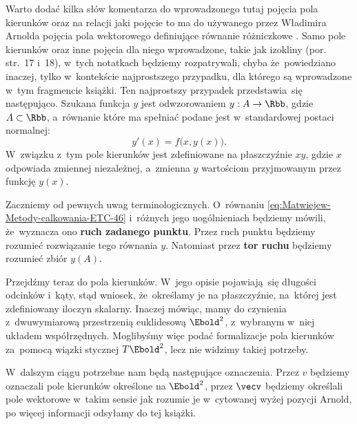 \documentclass[a4paper,11pt]{article}
\numberwithin{equation}{section}
\begin{document}
\VerSpaceFour





\noindent
{} Warto dodać kilka słów komentarza do wprowadzonego tutaj
pojęcia pola kierunków oraz na relacji jaki pojęcie to ma do używanego
przez Władimira Arnolda pojęcia pola wektorowego definiujące równanie
różniczkowe \cite{ArnoldRownaniaRozniczkoweZwyczajne1975}. Samo pole
kierunków oraz inne pojęcia dla niego wprowadzone, takie jak izokliny
(por. str.~17 i~18), w~tych notatkach będziemy rozpatrywali, chyba
że~powiedziano inaczej, tylko w~kontekście najprostszego przypadku, dla
którego są wprowadzone w~tym fragmencie książki. Ten najprostszy przypadek
przedstawia~się następująco. Szukana funkcja $y$ jest odwzorowaniem
$y : A \to \Rbb$, gdzie $A \subset \Rbb$, a~równanie które ma spełniać podane
jest w~standardowej postaci normalnej:
\begin{equation}
  \label{eq:Uwagi-do-konkrentych-stron-27}
  y'( x ) = f\big( x, y( x ) \big).
\end{equation}
W~związku z~tym pole kierunków jest zdefiniowane na płaszczyźnie $xy$,
gdzie $x$ odpowiada zmiennej niezależnej, a~zmienna $y$ wartościom
przyjmowanym przez funkcję $y( x )$.

Zaczniemy od pewnych uwag terminologicznych. O~równaniu
\eqref{eq:Matwiejew-Metody-calkowania-ETC-46} i~różnych jego
uogólnieniach będziemy mówili, że~wyznacza ono
\textbf{ruch zadanego punktu}. Przez ruch punktu będziemy rozumieć
rozwiązanie tego równania $y$. Natomiast przez \textbf{tor ruchu} będziemy
rozumieć zbiór $y( A )$.

Przejdźmy teraz do pola kierunków. W~jego opisie pojawiają~się długości
odcinków i~kąty, stąd wniosek, że~określamy je na płaszczyźnie, na~której
jest zdefiniowany iloczyn skalarny. Inaczej mówiąc, mamy do czynienia
z~dwuwymiarową
przestrzenią euklidesową $\Ebold^{ 2 }$, z~wybranym w~niej układem
współrzędnych. Moglibyśmy więc podać formalizacje pola kierunków za~pomocą
wiązki stycznej $T \Ebold^{ 2 }$, lecz nie widzimy takiej potrzeby.

W~dalszym ciągu potrzebne nam będą następujące oznaczenia. Przez $v$
będziemy oznaczali pole kierunków określone na $\Ebold^{ 2 }$, przez
$\vecv$ będziemy określali pole wektorowe w~takim sensie jak rozumie je
w~cytowanej wyżej pozycji Arnold, po więcej informacji odsyłamy do tej
książki.
\end{document}
